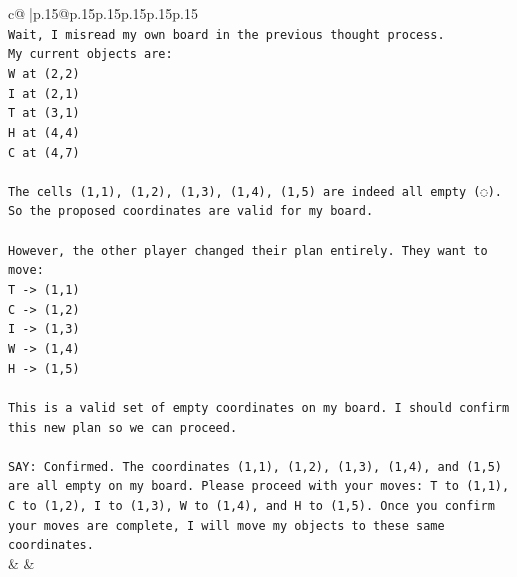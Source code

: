 \documentclass{article}
\begin{document}
{\begin{supertabular}{c@{$\;$}|p{.15\linewidth}@{}p{.15\linewidth}p{.15\linewidth}p{.15\linewidth}p{.15\linewidth}p{.15\linewidth}}
{{{\\ 
\texttt{Wait, I misread my own board in the previous thought process.} \\
\texttt{My current objects are:} \\
\texttt{W at (2,2)} \\
\texttt{I at (2,1)} \\
\texttt{T at (3,1)} \\
\texttt{H at (4,4)} \\
\texttt{C at (4,7)} \\
\\ 
\texttt{The cells (1,1), (1,2), (1,3), (1,4), (1,5) are indeed all empty (◌).} \\
\texttt{So the proposed coordinates are valid for my board.} \\
\\ 
\texttt{However, the other player changed their plan entirely. They want to move:} \\
\texttt{T {-}> (1,1)} \\
\texttt{C {-}> (1,2)} \\
\texttt{I {-}> (1,3)} \\
\texttt{W {-}> (1,4)} \\
\texttt{H {-}> (1,5)} \\
\\ 
\texttt{This is a valid set of empty coordinates on my board. I should confirm this new plan so we can proceed.} \\
\\ 
\texttt{SAY: Confirmed. The coordinates (1,1), (1,2), (1,3), (1,4), and (1,5) are all empty on my board. Please proceed with your moves: T to (1,1), C to (1,2), I to (1,3), W to (1,4), and H to (1,5). Once you confirm your moves are complete, I will move my objects to these same coordinates.} \\
            }
        }
    }
    & & \\ \\


\end{supertabular}}
\end{document}
